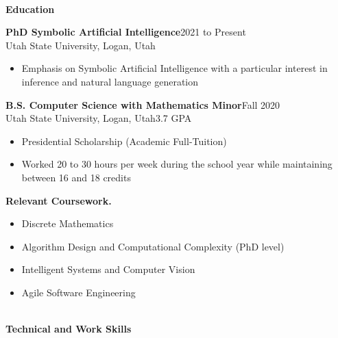 \documentclass[letterpaper,11pt]{article}
\begin{document}


\begin{Large}\textbf{\\Education}\end{Large}

\textbf{PhD Symbolic Artificial Intelligence}\hfill 2021 to Present\\
Utah State University, Logan, Utah
\begin{itemize}[noitemsep,topsep=0pt]
	\item Emphasis on Symbolic Artificial Intelligence with a particular interest in inference and natural language generation\\
\end{itemize}

\textbf{B.S. Computer Science with Mathematics Minor}\hfill Fall 2020\\
Utah State University, Logan, Utah\hfill 3.7 GPA
\begin{itemize}[noitemsep,topsep=0pt]
	\item Presidential Scholarship (Academic Full-Tuition)
	\item Worked 20 to 30 hours per week during the school year while maintaining between 16 and 18 credits\\
\end{itemize}

\textbf{Relevant Coursework.}
\begin{itemize}[noitemsep,topsep=0pt]
	\item Discrete Mathematics
	\item Algorithm Design and Computational Complexity (PhD level)
	\item Intelligent Systems and Computer Vision
	\item Agile Software Engineering
\end{itemize}


\begin{Large}\textbf{\\Technical and Work Skills}\end{Large}
\end{document}

